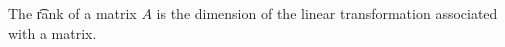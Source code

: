 


The \t{rank} of a matrix $A$ is the dimension of the linear transformation associated with a matrix.

\blankpage

